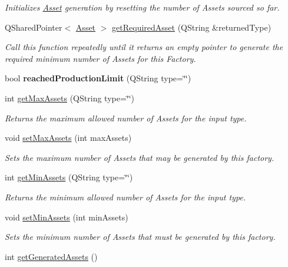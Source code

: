 \begin{DoxyCompactItemize}
\begin{DoxyCompactList}\small\item\em Initializes \hyperlink{class_picto_1_1_asset}{Asset} generation by resetting the number of Assets sourced so far. \end{DoxyCompactList}\item 
Q\-Shared\-Pointer$<$ \hyperlink{class_picto_1_1_asset}{Asset} $>$ \hyperlink{class_picto_1_1_asset_factory_a4106be868f80f09f3a64cea4de1f42dd}{get\-Required\-Asset} (Q\-String \&returned\-Type)
\begin{DoxyCompactList}\small\item\em Call this function repeatedly until it returns an empty pointer to generate the required minimum number of Assets for this Factory. \end{DoxyCompactList}\item 
\hypertarget{class_picto_1_1_asset_factory_a8ca9159baec04f2d5332eaebdbde2771}{bool {\bfseries reached\-Production\-Limit} (Q\-String type=\char`\"{}\char`\"{})}\label{class_picto_1_1_asset_factory_a8ca9159baec04f2d5332eaebdbde2771}

\item 
int \hyperlink{class_picto_1_1_asset_factory_a0f5b07c9df3fa261edc083396ec7f6df}{get\-Max\-Assets} (Q\-String type=\char`\"{}\char`\"{})
\begin{DoxyCompactList}\small\item\em Returns the maximum allowed number of Assets for the input type. \end{DoxyCompactList}\item 
void \hyperlink{class_picto_1_1_asset_factory_aeb33cb9006f15ede50c870f2c24e6c01}{set\-Max\-Assets} (int max\-Assets)
\begin{DoxyCompactList}\small\item\em Sets the maximum number of Assets that may be generated by this factory. \end{DoxyCompactList}\item 
int \hyperlink{class_picto_1_1_asset_factory_a1122b8a3f1529d0c7725d6594e948303}{get\-Min\-Assets} (Q\-String type=\char`\"{}\char`\"{})
\begin{DoxyCompactList}\small\item\em Returns the minimum allowed number of Assets for the input type. \end{DoxyCompactList}\item 
void \hyperlink{class_picto_1_1_asset_factory_a97003f49a756545c68dd4f754ceef550}{set\-Min\-Assets} (int min\-Assets)
\begin{DoxyCompactList}\small\item\em Sets the minimum number of Assets that must be generated by this factory. \end{DoxyCompactList}\item 
\hypertarget{class_picto_1_1_asset_factory_a1e09240d230de6aae8196d83a3b3764f}{int \hyperlink{class_picto_1_1_asset_factory_a1e09240d230de6aae8196d83a3b3764f}{get\-Generated\-Assets} ()}\label{class_picto_1_1_asset_factory_a1e09240d230de6aae8196d83a3b3764f}


\end{DoxyCompactItemize}
